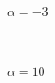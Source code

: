 \documentclass{article}
\begin{document}
\begin{figure}[h!]
\caption*{$ \alpha = -3 $}
\end{figure}\\
\begin{figure}[h!]
\caption*{$ \alpha = 10 $}
\end{figure}\\\\\\\\\\
\end{document}
